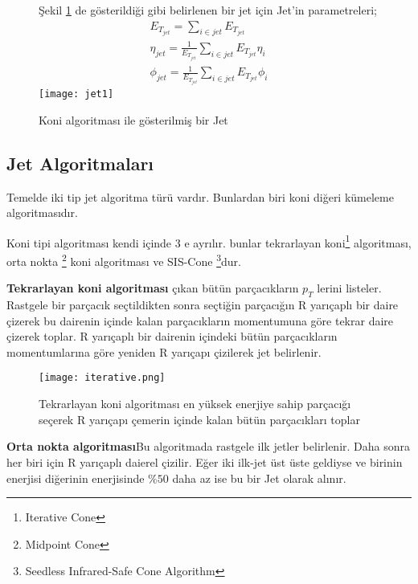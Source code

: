 \begin{figure}[!htbp]
\centering


\par Şekil \ref{fig:jet1} de gösterildiği gibi belirlenen bir jet için Jet'in parametreleri;
\begin{equation}
\begin{aligned}
E_{T_{jet}} = \sum_{i \in jet } E_{T_{jet}} \\
\eta_{jet} =\frac{1}{E_{T_{jet}}} \sum_{i \in jet }E_{T_{jet}} \eta_i \\
\phi_{jet} = \frac{1}{E_{T_{jet}}} \sum_{i \in jet }E_{T_{jet}} \phi_i
\end{aligned}
\end{equation}
\texttt{[image: jet1]}
\caption{Koni algoritması ile gösterilmiş bir Jet}
\label{fig:jet1}
\end{figure}
\subsection{Jet Algoritmaları}
Temelde iki tip jet algoritma türü vardır. Bunlardan biri koni diğeri kümeleme algoritmasıdır.
\par Koni tipi algoritması kendi içinde 3 e ayrılır. bunlar tekrarlayan koni\footnote{Iterative Cone}  algoritması,  orta nokta \footnote{Midpoint Cone} koni algoritması ve SIS-Cone \footnote{Seedless Infrared-Safe Cone Algorithm}dur. 

\par \textbf{Tekrarlayan koni algoritması} çıkan bütün parçacıkların $p_T$ lerini listeler. Rastgele bir parçacık seçtildikten sonra seçtiğin parçacığın R yarıçaplı bir daire çizerek bu dairenin içinde kalan parçacıkların momentumuna göre tekrar daire çizerek toplar. R yarıçaplı bir dairenin içindeki bütün parçacıkların momentumlarına göre yeniden R yarıçapı çizilerek jet belirlenir.
\begin{figure}[!htbp]
\centering
\texttt{[image: iterative.png]}
\caption{Tekrarlayan koni algoritması en yüksek enerjiye sahip parçacığı seçerek R yarıçapı çemerin içinde kalan bütün parçacıkları toplar}
\end{figure}

\par \textbf{Orta nokta algoritması}Bu algoritmada rastgele ilk jetler belirlenir. Daha sonra her biri için R yarıçaplı daierel çizilir. Eğer iki ilk-jet üst üste geldiyse ve birinin enerjisi diğerinin enerjisinde $\%50$ daha az ise bu bir Jet olarak alınır. 



